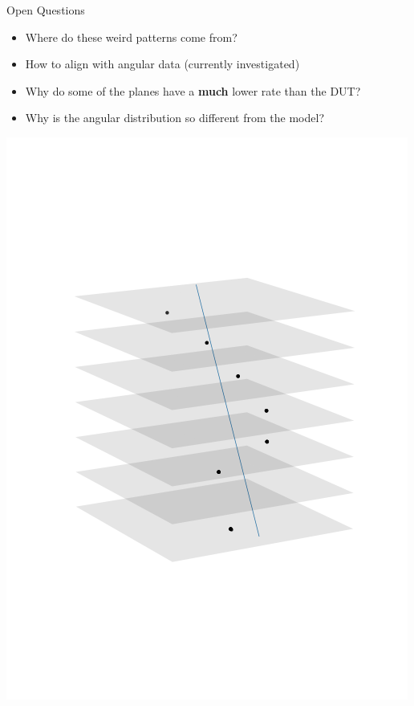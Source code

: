 \documentclass{beamer}
\begin{document}
\begin{frame}{Open Questions}
    \begin{minipage}{.75\textwidth}
	
    \begin{itemize}
	\setlength\itemsep{3em}
	\footnotesize
	\item Where do these weird patterns come from? 
	\item How to align with angular data (currently investigated)
	\item Why do some of the planes have a \textbf{much} lower rate
	    than the DUT? \\
	\item Why is the angular distribution so different from the model?
    \end{itemize}
    \end{minipage}
    \begin{minipage}{.24\textwidth}
	    \includegraphics[width=\textwidth]{Open_HighChi.png} \\

\end{minipage}
\end{frame}
\end{document}
